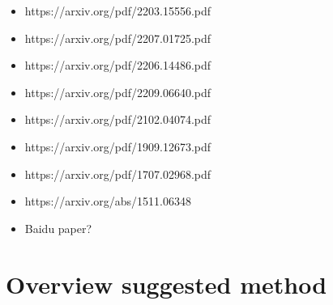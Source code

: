 \documentclass{article} %
\begin{document}
\begin{itemize}
    \item https://arxiv.org/pdf/2203.15556.pdf
    \item https://arxiv.org/pdf/2207.01725.pdf
    \item https://arxiv.org/pdf/2206.14486.pdf
    \item https://arxiv.org/pdf/2209.06640.pdf
    \item https://arxiv.org/pdf/2102.04074.pdf
    \item https://arxiv.org/pdf/1909.12673.pdf
    \item https://arxiv.org/pdf/1707.02968.pdf
    \item https://arxiv.org/abs/1511.06348
    \item Baidu paper?
\end{itemize}

\section{Overview suggested method}
\end{document}
